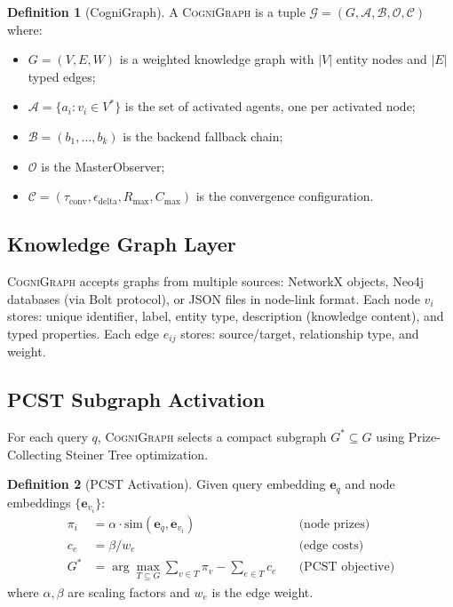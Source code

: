 \documentclass[a4paper,11pt]{article}
\theoremstyle{definition}
\newtheorem{definition}{Definition}[section]
\newcommand{\cogni}{\textsc{CogniGraph}}
\begin{document}
\begin{definition}[CogniGraph]
\label{def:cognigraph}
A \cogni{} is a tuple $\mathcal{G} = (G, \mathcal{A}, \mathcal{B}, \mathcal{O}, \mathcal{C})$ where:
\begin{itemize}
\item $G = (V, E, W)$ is a weighted knowledge graph with $|V|$ entity nodes and $|E|$ typed edges;
\item $\mathcal{A} = \{a_i : v_i \in V^*\}$ is the set of activated agents, one per activated node;
\item $\mathcal{B} = (b_1, \ldots, b_k)$ is the backend fallback chain;
\item $\mathcal{O}$ is the MasterObserver;
\item $\mathcal{C} = (\tau_{\mathrm{conv}}, \epsilon_{\mathrm{delta}}, R_{\max}, C_{\max})$ is the convergence configuration.
\end{itemize}
\end{definition}

\subsection{Knowledge Graph Layer}

\cogni{} accepts graphs from multiple sources: NetworkX objects, Neo4j databases (via Bolt protocol), or JSON files in node-link format.
Each node $v_i$ stores: unique identifier, label, entity type, description (knowledge content), and typed properties.
Each edge $e_{ij}$ stores: source/target, relationship type, and weight.

\subsection{PCST Subgraph Activation}
\label{sec:activation}

For each query $q$, \cogni{} selects a compact subgraph $G^* \subseteq G$ using Prize-Collecting Steiner Tree optimization.

\begin{definition}[PCST Activation]
Given query embedding $\mathbf{e}_q$ and node embeddings $\{\mathbf{e}_{v_i}\}$:
\begin{align}
\pi_i &= \alpha \cdot \mathrm{sim}(\mathbf{e}_q, \mathbf{e}_{v_i}) \quad &\text{(node prizes)} \\
c_e &= \beta / w_e \quad &\text{(edge costs)} \\
G^* &= \arg\max_{T \subseteq G} \sum_{v \in T} \pi_v - \sum_{e \in T} c_e \quad &\text{(PCST objective)}
\end{align}
where $\alpha, \beta$ are scaling factors and $w_e$ is the edge weight.
\end{definition}
\end{document}
